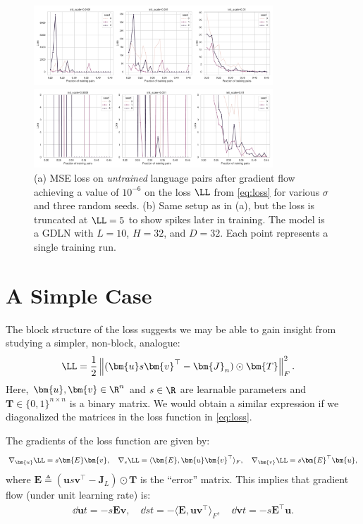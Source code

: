 \documentclass{article}
\begin{document}
\begin{figure}[!ht]
    \centering
    \includegraphics[width=0.8\textwidth]{results_exact.pdf}

    \vspace{1em}

    \includegraphics[width=0.8\textwidth]{results_exact_truncated.pdf}

    \caption{(a) MSE loss on \emph{untrained} language pairs after gradient flow achieving a value of $10^{-6}$ on the loss $\LL$ from \cref{eq:loss} for various $\sigma$ and three random seeds.
    (b) Same setup as in (a), but the loss is truncated at $\LL = 5$ to show spikes later in training.
    The model is a GDLN with $L = 10$, $H = 32$, and $D = 32$. Each point represents a single training run.}
    \label{fig:loss}
\end{figure}
\FloatBarrier


\section{A Simple Case}
The block structure of the loss suggests we may be able to gain insight from studying a simpler, non-block, analogue:
\begin{align}
    \LL
    &= \frac{1}{2} \left\Vert ( \bm{u} s \bm{v}^\top - \bm{J}_n ) \odot \bm{T} \right\Vert_F^2.
    \label{eq:simple_loss}
\end{align}
Here, $\bm{u}, \bm{v} \in \R^n$ and $s \in \R$ are learnable parameters and $\bm{T} \in \{ 0,1 \}^{n \times n}$ is a binary matrix.
We would obtain a similar expression if we diagonalized the matrices in the loss function in \cref{eq:loss}.

The gradients of the loss function are given by:
\begin{align*}
    \nabla_{\bm{u}} \LL = s \bm{E} \bm{v}, \quad
    \nabla_{s} \LL = \langle \bm{E}, \bm{u} \bm{v}^\top \rangle_F, \quad
    \nabla_{\bm{v}} \LL = s \bm{E}^\top \bm{u},
\end{align*}
where $\bm{E} \triangleq ( \bm{u} s \bm{v}^\top - \bm{J}_L ) \odot \bm{T}$ is the ``error'' matrix.
This implies that gradient flow (under unit learning rate) is:
\begin{align*}
    \dd{\bm{u}}{t} = - s \bm{E} \bm{v}, \quad
    \dd{s}{t} = - \langle \bm{E}, \bm{u} \bm{v}^\top \rangle_F, \quad
    \dd{\bm{v}}{t} = - s \bm{E}^\top \bm{u}.
\end{align*}
\end{document}
